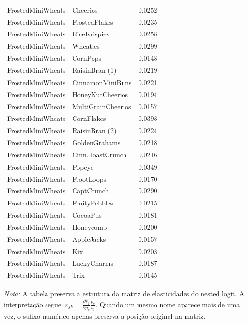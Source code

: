 \begin{table}[H]
\begin{tabular}{llr}
FrostedMiniWheats & Cheerios & 0.0252 \\
FrostedMiniWheats & FrostedFlakes & 0.0235 \\
FrostedMiniWheats & RiceKrispies & 0.0258 \\
FrostedMiniWheats & Wheaties & 0.0299 \\
FrostedMiniWheats & CornPops & 0.0148 \\
FrostedMiniWheats & RaisinBran (1) & 0.0219 \\
FrostedMiniWheats & CinnamonMiniBuns & 0.0221 \\
FrostedMiniWheats & HoneyNutCheerios & 0.0194 \\
FrostedMiniWheats & MultiGrainCheerios & 0.0157 \\
FrostedMiniWheats & CornFlakes & 0.0393 \\
FrostedMiniWheats & RaisinBran (2) & 0.0224 \\
FrostedMiniWheats & GoldenGrahams & 0.0218 \\
FrostedMiniWheats & Cinn.ToastCrunch & 0.0216 \\
FrostedMiniWheats & Popeye & 0.0349 \\
FrostedMiniWheats & FrootLoops & 0.0170 \\
FrostedMiniWheats & CaptCrunch & 0.0290 \\
FrostedMiniWheats & FruityPebbles & 0.0215 \\
FrostedMiniWheats & CocoaPus & 0.0181 \\
FrostedMiniWheats & Honeycomb & 0.0200 \\
FrostedMiniWheats & AppleJacks & 0.0157 \\
FrostedMiniWheats & Kix & 0.0203 \\
FrostedMiniWheats & LuckyCharms & 0.0187 \\
FrostedMiniWheats & Trix & 0.0145 \\
\bottomrule
\end{tabular}

\vspace{0.3em}
\footnotesize
\textit{Nota:} A tabela preserva a estrutura da matriz de elasticidades do nested logit. A interpretação segue: $\varepsilon_{jk}=\frac{\partial s_j}{\partial p_k}\frac{p_k}{s_j}$. Quando um mesmo nome aparece mais de uma vez, o sufixo numérico apenas preserva a posição original na matriz.
\end{table}
\endgroup


